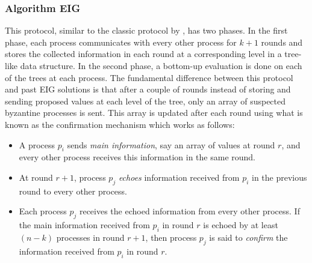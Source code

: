 \subsubsection{Algorithm EIG \cite{KM13}}
This protocol, similar to the classic protocol by \cite{Bar-NoyD91}, has two phases. In the first phase, each process communicates with every other process for $k + 1$ rounds and stores the collected information in each round at a corresponding level in a tree-like data structure. In the second phase, a bottom-up evaluation is done on each of the trees at each process. The fundamental difference between this protocol and past EIG solutions is that after a couple of rounds instead of storing and sending proposed values at each level of the tree, only an array of suspected byzantine processes is sent. This array is updated after each round using what is known as the confirmation mechanism which works as follows:
\begin{itemize}
\item A process $p_i$ sends \textit{main information}, say an array of values at round $r$, and every other process receives this information in the same round.
\item At round $r+1$, process $p_j$ \textit{echoes} information received from $p_i$ in the previous round to every other process. 
\item Each process $p_j$ receives the echoed information from every other process. If the main information received from $p_i$ in round $r$ is echoed by at least $(n - k)$ processes in round $r+1$, then process $p_j$ is said to \textit{confirm} the information received from $p_i$ in round $r$.
    \end{itemize}

